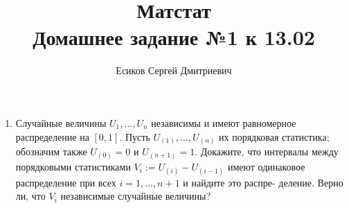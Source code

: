 \documentclass[12pt]{article}
\title{\textbf{Матстат}\\Домашнее задание №1 к 13.02}
\author{Есиков Сергей Дмитриевич}
\begin{document}
\maketitle

\begin{enumerate}[label=\textbf{\arabic*.}, left=0pt]

    \item Случайные величины \(U_1, \dots, U_n\) независимы и имеют равномерное распределение
          на \([0, 1]\). Пусть \(U_{(1)}, \dots, U_{(n)}\) их порядковая статистика; обозначим также \(U_{(0)} = 0\) и
          \(U_{(n+1)} = 1\). Докажите, что интервалы между порядковыми статистиками \(V_i := U_{(i)} -
          U_{(i-1)}\) имеют одинаковое распределение при всех \(i = 1, \dots , n+1\) и найдите это распре-
          деление. Верно ли, что \(V_i\) независимые случайные величины?


\end{enumerate}
\end{document}
